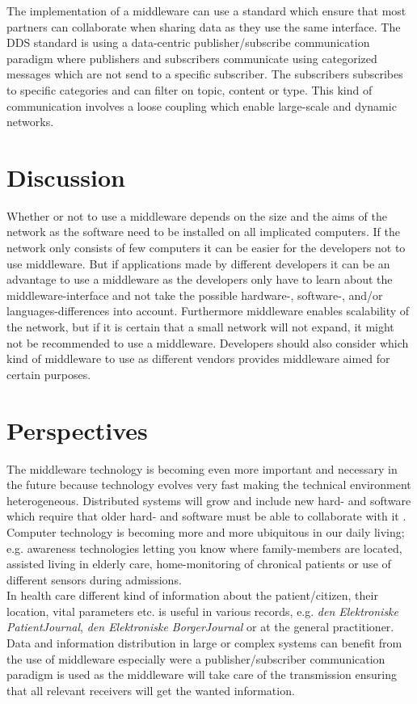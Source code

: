 \documentclass[Main]{subfiles}
\begin{document}
The implementation of a middleware can use a standard which ensure that most partners can collaborate when sharing data as they use the same interface. 
The DDS standard is using a data-centric publisher/subscribe communication paradigm where publishers and subscribers communicate using categorized messages which are not send to a specific subscriber. 
The subscribers subscribes to specific categories and can filter on topic, content or type. 
This kind of communication involves a loose coupling which enable large-scale and dynamic networks.





\section{Discussion}
Whether or not to use a middleware depends on the size and the aims of the network as the software need to be installed on all implicated computers. 
If the network only consists of few computers it can be easier for the developers not to use middleware. 
But if applications made by different developers it can be an advantage to use a middleware as the developers only have to learn about the middleware-interface and not take the possible hardware-, software-, and/or languages-differences into account.
 Furthermore middleware enables scalability of the network, but if it is certain that a small network will not expand, it might not be recommended to use a middleware. 
 Developers should also consider which kind of middleware to use as different vendors provides middleware aimed for certain purposes. 







\section{Perspectives}
The middleware technology is becoming even more important and necessary in the future because technology evolves very fast making the technical environment heterogeneous. 
Distributed systems will grow and include new hard- and software which require that older hard- and software must be able to collaborate with it  \cite{whereIsMiddleware}.
\\
Computer technology is becoming more and more ubiquitous in our daily living; e.g. awareness technologies letting you know where family-members are located, assisted living in elderly care, home-monitoring of chronical patients or use of different sensors during admissions.
\\
In health care different kind of information about the patient/citizen, their location, vital parameters etc. is useful in various records, e.g. \textit{den Elektroniske PatientJournal}, \textit{den Elektroniske BorgerJournal} or at the general practitioner.
\\
Data and information distribution in large or complex systems can benefit from the use of middleware especially were a publisher/subscriber communication paradigm is used as the middleware will take care of the transmission ensuring that all relevant receivers will get the wanted information.
\end{document}
